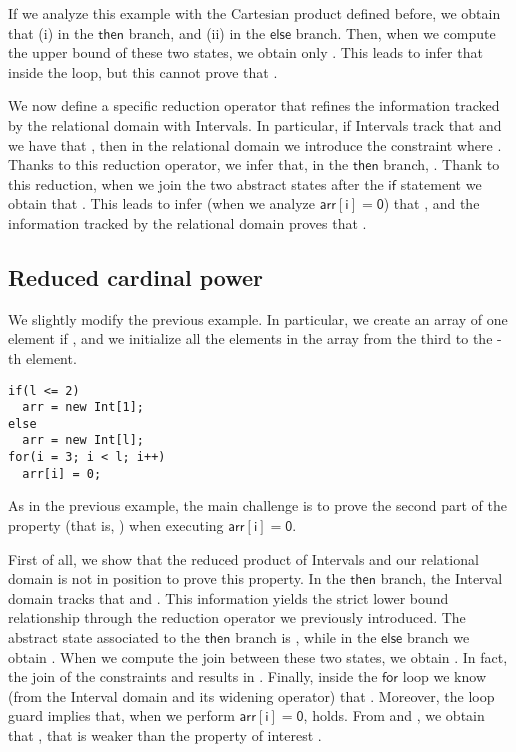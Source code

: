 \documentclass[submission,copyright,creativecommons]{eptcs}
\newcommand{\statement}[1]{\ensuremath{\mathsf{#1}}}
\begin{document}
If we analyze this example with the Cartesian product defined before, we obtain that (i)  in the \statement{then} branch, and (ii)  in the \statement{else} branch. Then, when we compute the upper bound of these two states, we obtain only . This leads to infer that  inside the loop, but this cannot prove that .

We now define a specific reduction operator that refines the information tracked by the relational domain with Intervals. In particular, if Intervals track that  and we have that , then in the relational domain we introduce the constraint  where . Thanks to this reduction operator, we infer that, in the \statement{then} branch, . Thank to this reduction, when we join the two abstract states after the \statement{if} statement we obtain that . This leads to infer (when we analyze \statement{arr[i]=0}) that , and the information tracked by the relational domain proves that .


\subsection{Reduced cardinal power}
We slightly modify the previous example. In particular, we create an array of one element if , and we initialize all the elements in the array from the third to the -th element.

\begin{lstlisting}
if(l <= 2)
  arr = new Int[1];
else 
  arr = new Int[l];
for(i = 3; i < l; i++)
  arr[i] = 0;
\end{lstlisting}

As in the previous example, the main challenge is to prove the second part of the property (that is, ) when executing \statement{arr[i]=0}.

First of all, we show that the reduced product of Intervals and our relational domain is not in position to prove this property.
In the \statement{then} branch, the Interval domain tracks that  and . This information yields the strict lower bound relationship  through the reduction operator we previously introduced. The abstract state associated to the \statement{then} branch is , while in the \statement{else} branch we obtain . When we compute the join between these two states, we obtain . In fact, the join of the constraints  and  results in . Finally, inside the \statement{for} loop we know (from the Interval domain and its widening operator) that . Moreover, the loop guard implies that, when we perform \statement{arr[i]=0},  holds. From  and , we obtain that , that is weaker than the property of interest .
\end{document}
